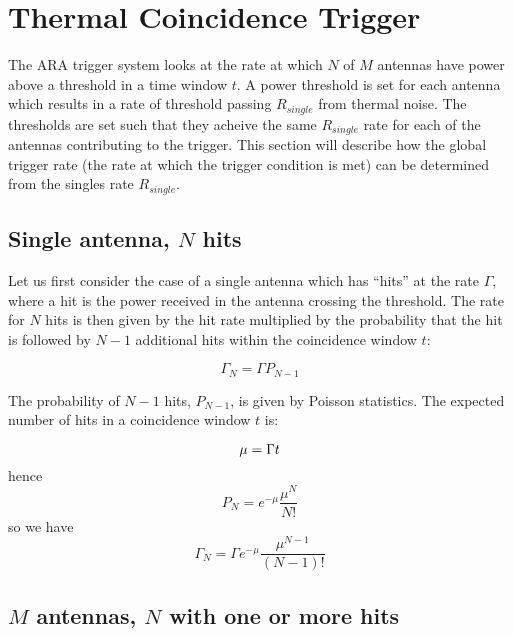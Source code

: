 \chapter{Thermal Coincidence Trigger}
\label{chap:appendix:trigger}

The ARA trigger system looks at the rate at which $N$ of $M$ antennas have power above a threshold in a time window $t$. A power threshold is set for each antenna which results in a rate of threshold passing $R_{single}$ from thermal noise. The thresholds are set such that they acheive the same $R_{single}$ rate for each of the antennas contributing to the trigger. This section will describe how the global trigger rate (the rate at which the trigger condition is met) can be determined from the singles rate $R_{single}$.



\section{Single antenna, $N$ hits}
Let us first consider the case of a single antenna which has ``hits'' at the rate $\Gamma$, where a hit is the power received in the antenna crossing the threshold. The rate for $N$ hits is then given by the hit rate multiplied by the probability that the hit is followed by $N-1$ additional hits within the coincidence window $t$:

\begin{equation}
  \Gamma_{N} = \Gamma P_{N-1}
\end{equation}

The probability of $N-1$ hits, $P_{N-1}$, is given by Poisson statistics. The expected number of hits in a coincidence window $t$ is:

\begin{equation}
  \mu = \Gamma t\\
\end{equation}
hence
\begin{equation}
  P_{N} = e^{-\mu}\frac{\mu^{N}}{N!}
\end{equation}
so we have
\begin{equation}
  \Gamma_{N} = \Gamma e^{-\mu}\frac{\mu^{N-1}}{(N-1)!}
\end{equation}

\section{$M$ antennas, $N$ with one or more hits}

